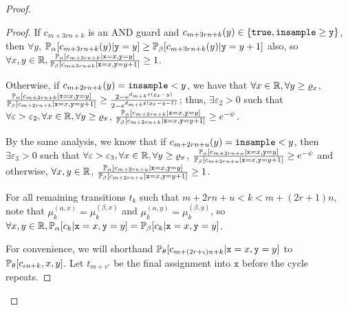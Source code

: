 \begin{proof}
\begin{proof}
		If $c_{m+3rn+k}$ is an AND guard and $c_{m+3rn+k}(y) \in \{\texttt{true}, \gguard[\texttt{y}]\}$, then $\forall y$, $\PP_\alpha[c_{m+3rn+k}(y)|\texttt{y}=y]\geq \PP_\beta[c_{m+3rn+k}(y)|\texttt{y}=y+1]$ also, so $\forall x, y\in \RR, \frac{\PP_\alpha[c_{m+3rn+k}|\texttt{x}=x, \texttt{y}=y]}{\PP_\beta[c_{m+3rn+k}|\texttt{x}=x, \texttt{y}=y+1]}\geq 1$.

		Otherwise, if $c_{m+2rn+k}(y) =\lguard[y]$, we have that $\forall x\in \RR, \forall y\geq \varrho_x$, $\frac{\PP_\alpha[c_{m+2rn+k}|\texttt{x}=x, \texttt{y}=y]}{\PP_\beta[c_{m+2rn+k}|\texttt{x}=x, \texttt{y}=y+1]} \geq \frac{2-e^{d_{m+k}\varepsilon(\varrho_x-y)}}{2-e^{d_{m+k}\varepsilon(\varrho_x-y-1)}}$; 
		thus, $\exists \varepsilon_2>0$ such that $\forall \varepsilon>\varepsilon_2, \forall x\in \RR, \forall y\geq \varrho_x$, $\frac{\PP_\alpha[c_{m+2rn+k}|\texttt{x}=x, \texttt{y}=y]}{\PP_\beta[c_{m+2rn+k}|\texttt{x}=x, \texttt{y}=y+1]}\geq e^{-\psi}$.

		By the same analysis, we know that if $c_{m+2rn+u}(y) =\lguard[y]$, then $\exists \varepsilon_3>0$ such that $\forall \varepsilon>\varepsilon_3, \forall x\in \RR, \forall y\geq \varrho_x$, $\frac{\PP_\alpha[c_{m+2rn+u}|\texttt{x}=x, \texttt{y}=y]}{\PP_\beta[c_{m+2rn+u}|\texttt{x}=x, \texttt{y}=y+1]}\geq e^{-\psi}$ 
		and otherwise, $\forall x, y\in \RR$, $\frac{\PP_\alpha[c_{m+2rn+u}|\texttt{x}=x, \texttt{y}=y]}{\PP_\beta[c_{m+2rn+u}|\texttt{x}=x, \texttt{y}=y+1]}\geq 1$.

		
		For all remaining transitions $t_k$ such that $m+2rn+u<k<m+(2r+1)n$, note that $\mu_k^{(\alpha, x)}=\mu_k^{(\beta, x)}$ and $\mu_k^{(\alpha, y)}=\mu_k^{(\beta, y)}$, so $\forall x, y\in \RR, \PP_\alpha[c_k|\texttt{x}=x, \texttt{y}=y]=\PP_\beta[c_k|\texttt{x}=x, \texttt{y}=y]$.

		For convenience, we will shorthand $\PP_\theta[c_{m+(2r+\iota)n+k}|\texttt{x} = x, \texttt{y} = y]$ to $\PP_\theta[c_{\iota n+k}, x, y]$. Let $t_{m+v'}$ be the final assignment into $\texttt{x}$ before the cycle repeats. 


\end{proof}
\end{proof}
